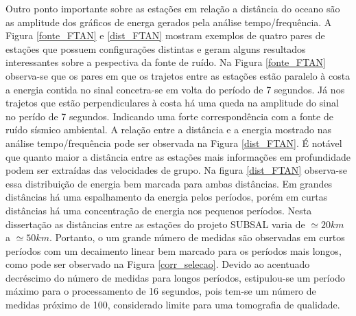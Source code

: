 Outro ponto importante sobre as estações em relação a distância do oceano são as amplitude dos gráficos de energa gerados pela análise tempo/frequência. A Figura \ref{fonte_FTAN} e \ref{dist_FTAN} mostram exemplos de quatro pares de estações que possuem configurações distintas e geram alguns resultados interessantes sobre a pespectiva da fonte de ruído. Na Figura \ref{fonte_FTAN} observa-se que os pares em que os trajetos entre as estações estão paralelo à costa a energia contida no sinal concetra-se em volta do período de 7 segundos. Já nos trajetos que estão perpendiculares à costa há uma queda na amplitude do sinal no perído de 7 segundos. Indicando uma forte correspondência com a fonte de ruído sísmico ambiental. A relação entre a distância e a energia mostrado nas análise tempo/frequência pode ser observada na Figura \ref{dist_FTAN}. É notável que quanto maior a distância entre as estações mais informações em profundidade podem ser extraídas das velocidades de grupo. Na figura \ref{dist_FTAN} observa-se essa distribuição de energia bem marcada para ambas distâncias. Em grandes distâncias há uma  espalhamento da energia pelos períodos, porém em curtas distâncias há uma concentração de energia nos pequenos períodos. Nesta dissertação as distâncias entre as estações do projeto SUBSAL varia de $\simeq 20 km$ a $\simeq 50 km$. Portanto, o um grande número de medidas são observadas em curtos períodos com um decaimento linear bem marcado para os períodos mais longos, como pode ser observado na Figura \ref{corr_selecao}. Devido ao acentuado decréscimo do número de medidas para longos períodos, estipulou-se um período máximo para o processamento de 16 segundos, pois tem-se um número de medidas próximo de 100, considerado limite para uma tomografia de qualidade.

